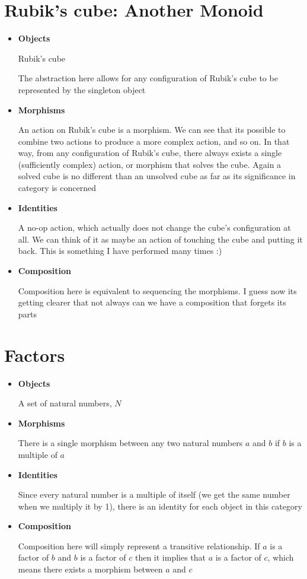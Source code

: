 \documentclass{article}
\begin{document}
\section{Rubik's cube: Another Monoid}
\begin{itemize}
\item \textbf{Objects}

  Rubik's cube

  The abstraction here allows for any configuration of Rubik's cube to be
  represented by the singleton object

\item \textbf{Morphisms}

  An action on Rubik's cube is a morphism. We can see that its possible to
  combine two actions to produce a more complex action, and so on. In that way,
  from any configuration of Rubik's cube, there always exists a single
  (sufficiently complex) action, or morphism that solves the cube. Again a
  solved cube is no different than an unsolved cube as far as its significance
  in category is concerned

\item \textbf{Identities}

  A no-op action, which actually does not change the cube's configuration at
  all. We can think of it as maybe an action of touching the cube and putting it
  back. This is something I have performed many times :)

\item \textbf{Composition}

  Composition here is equivalent to sequencing the morphisms. I guess now its
  getting clearer that not always can we have a composition that forgets its parts

\end{itemize}

\section{Factors}
\begin{itemize}
\item \textbf{Objects}

  A set of natural numbers, $N$

\item \textbf{Morphisms}

  There is a single morphism between any two natural numbers $a$ and $b$ if $b$
  is a multiple of $a$

\item \textbf{Identities}

  Since every natural number is a multiple of itself (we get the same number
  when we multiply it by 1), there is an identity for each object in this category

\item \textbf{Composition}

  Composition here will simply represent a transitive relationship. If $a$ is a
  factor of $b$ and $b$ is a factor of $c$ then it implies that $a$ is a factor
  of $c$, which means there exists a morphism between $a$ and $c$

\end{itemize}
\end{document}
